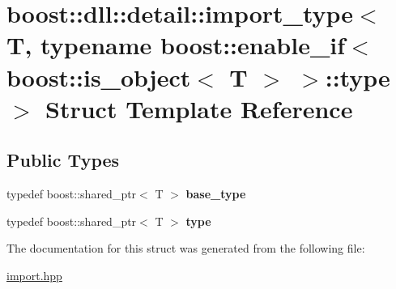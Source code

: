 \hypertarget{a01644}{}\section{boost\+:\+:dll\+:\+:detail\+:\+:import\+\_\+type$<$ T, typename boost\+:\+:enable\+\_\+if$<$ boost\+:\+:is\+\_\+object$<$ T $>$ $>$\+:\+:type $>$ Struct Template Reference}
\label{a01644}
\subsection*{Public Types}
\begin{DoxyCompactItemize}
\item 
\mbox{\label{a01644_add0253b94384ed45c179b8cac9483401}} 
typedef boost\+::shared\+\_\+ptr$<$ T $>$ {\bfseries base\+\_\+type}
\item 
\mbox{\label{a01644_abfa036f322955328a8fe74db901065ba}} 
typedef boost\+::shared\+\_\+ptr$<$ T $>$ {\bfseries type}
\end{DoxyCompactItemize}


The documentation for this struct was generated from the following file\+:\begin{DoxyCompactItemize}
\item 
\hyperlink{a00254}{import.\+hpp}\end{DoxyCompactItemize}
